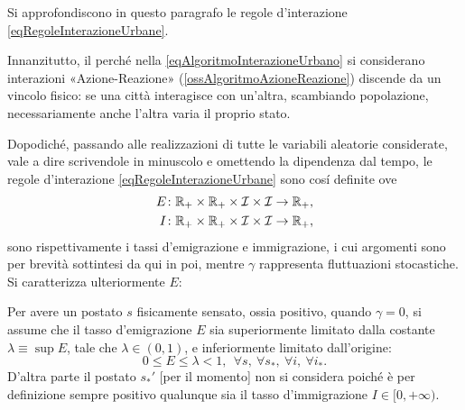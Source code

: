                 Si approfondiscono in questo paragrafo le regole d'interazione \ref{eqRegoleInterazioneUrbane}.

                Innanzitutto, il perché nella \ref{eqAlgoritmoInterazioneUrbano} si considerano interazioni «Azione-Reazione» (\cref{ossAlgoritmoAzioneReazione}) discende da un vincolo fisico: se una città interagisce con un'altra, scambiando popolazione, necessariamente anche l'altra varia il proprio stato.

                Dopodiché, passando alle realizzazioni di tutte le variabili aleatorie considerate, vale a dire scrivendole in minuscolo e omettendo la dipendenza dal tempo, le regole d'interazione \ref{eqRegoleInterazioneUrbane} sono cosí definite\footnotemark{}%
                ove
                \begin{equation*}
                    \begin{aligned}
                        E\colon\mathbb R_+\times\mathbb R_+\times\mathcal I\times\mathcal I\to\mathbb R_+,\\
                        I\colon\mathbb R_+\times\mathbb R_+\times\mathcal I\times\mathcal I\to\mathbb R_+,
                    \end{aligned}
                \end{equation*}
                sono rispettivamente i tassi d'emigrazione e immigrazione, i cui argomenti sono per brevità sottintesi da qui in poi, mentre \(\gamma\) rappresenta fluttuazioni stocastiche. Si caratterizza ulteriormente \(E\):

                \begin{ipo}
                    Per avere un postato \(s\) fisicamente sensato, ossia positivo, quando \(\gamma=0\), si assume che il tasso d'emigrazione \(E\) sia superiormente limitato dalla costante \(\lambda\equiv\sup E\), tale che \(\lambda\in(0,1)\), e inferiormente limitato dall'origine:
                    \begin{equation*}
                        0\leq E\leq\lambda<1,\ \ \forall s,\ \forall s_*,\ \forall i,\ \forall i_*.
                    \end{equation*}
                    D'altra parte il postato \(s_*'\) [per il momento] non si considera poiché è per definizione sempre positivo qualunque sia il tasso d'immigrazione \(I\in[0,+\infty)\).
                \end{ipo}
               
